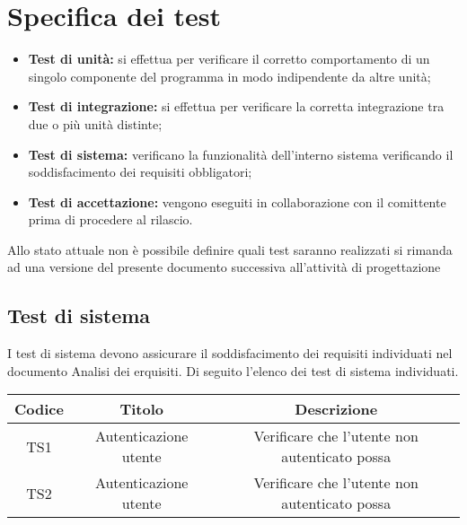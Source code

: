 \section{Specifica dei test}
\begin{itemize}
    \item \textbf{Test di unità:} si effettua per verificare il corretto comportamento di un singolo componente del programma in modo indipendente da altre unità;
    \item \textbf{Test di integrazione:} si effettua per verificare la corretta integrazione tra due o più unità distinte;
    \item \textbf{Test di sistema:} verificano la funzionalità dell'interno sistema verificando il soddisfacimento dei requisiti obbligatori;
    \item \textbf{Test di accettazione:} vengono eseguiti in collaborazione con il comittente prima di procedere al rilascio.
\end{itemize}

Allo stato attuale non è possibile definire quali test saranno realizzati si rimanda ad una versione del presente documento successiva all'attività di progettazione


\subsection{Test di sistema}

I test di sistema devono assicurare il soddisfacimento dei requisiti individuati nel documento Analisi dei erquisiti. 
Di seguito l'elenco dei test di sistema individuati.

\begin{center}
	\begin{longtable}{|c|c|c|}
	\hline
	\rowcolor{lighter-grayer}
	\textbf{Codice} & \textbf{Titolo} & \textbf{Descrizione} \\
	\hline
	\endfirsthead



	\hline
	TS1 & Autenticazione utente & Verificare che l'utente non autenticato possa  \\
	TS2 & Autenticazione utente & Verificare che l'utente non autenticato possa  \\

	\hline

	\end{longtable}
\end{center}


